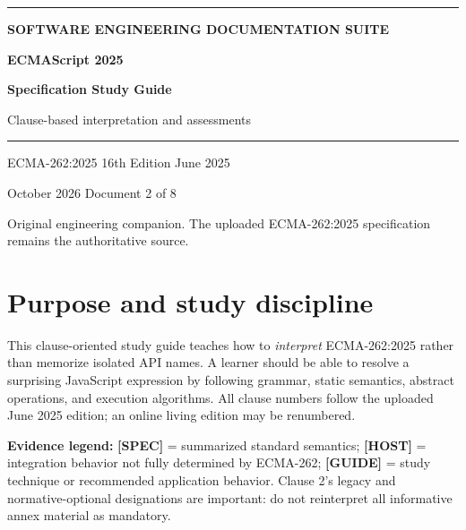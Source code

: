\documentclass[11pt,letterpaper]{article}
\begin{document}
\hypersetup{pageanchor=false}%
\begin{titlepage}
\thispagestyle{empty}
\vspace*{2.8cm}
{\color{Gold}\rule{18mm}{3pt}}\par\vspace{18mm}
{\sffamily\Large\bfseries\color{Teal} SOFTWARE ENGINEERING DOCUMENTATION SUITE}\par
\vspace{8mm}
{\sffamily\huge\bfseries\color{DeepNavy} ECMAScript 2025 }\par
\vspace{4mm}
{\sffamily\fontsize{24}{29}\selectfont\bfseries\color{DeepNavy} Specification Study Guide }\par
\vspace{10mm}
{\large\color{Slate} Clause-based interpretation and assessments }\par
\vspace{16mm}
{\color{Teal}\rule{\textwidth}{0.8pt}}\par
\vfill
{\sffamily\color{Slate}\large ECMA-262:2025 \textbullet{} 16th Edition \textbullet{} June 2025}\par
\vspace{3mm}
{\sffamily\color{Slate} October 2026 \textbullet{} Document 2 of 8}\par
\vspace{3mm}
{\small\color{Slate} Original engineering companion. The uploaded ECMA-262:2025 specification remains the authoritative source.}\par
\end{titlepage}\hypersetup{pageanchor=true}
\tableofcontents
\clearpage
\section{Purpose and study discipline}\label{purpose-and-study-discipline}

This clause-oriented study guide teaches how to \emph{interpret} ECMA-262:2025 rather than memorize isolated API names. A learner should be able to resolve a surprising JavaScript expression by following grammar, static semantics, abstract operations, and execution algorithms. All clause numbers follow the uploaded June 2025 edition; an online living edition may be renumbered.

\textbf{Evidence legend:} \textbf{{[}SPEC{]}} = summarized standard semantics; \textbf{{[}HOST{]}} = integration behavior not fully determined by ECMA-262; \textbf{{[}GUIDE{]}} = study technique or recommended application behavior. Clause 2's legacy and normative-optional designations are important: do not reinterpret all informative annex material as mandatory.
\end{document}
